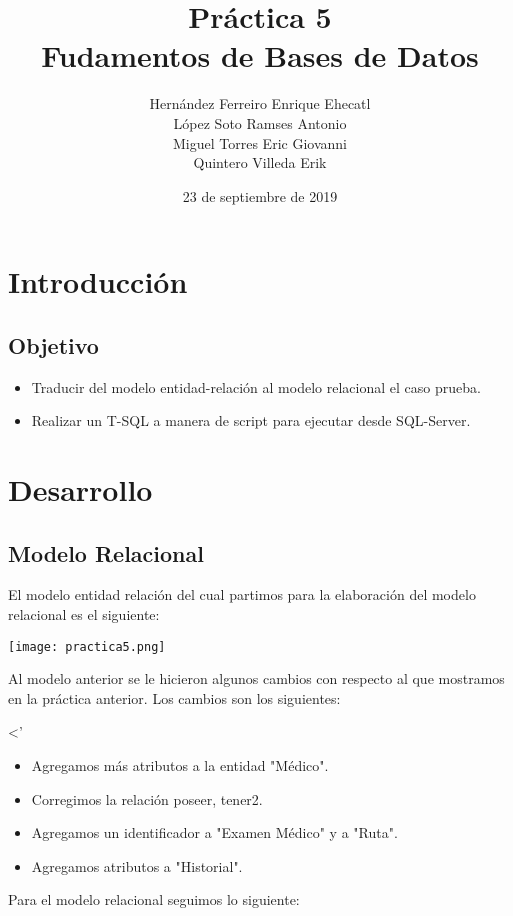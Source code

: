 \documentclass[12pt, letterpaper]{article}
\author{Hernández Ferreiro Enrique Ehecatl \\
        López Soto Ramses Antonio \\
        Miguel Torres Eric Giovanni \\
        Quintero Villeda Erik}
\title{Práctica 5 \\
       {\small Fudamentos de Bases de Datos}}
\date{23 de septiembre de 2019}
\begin{document}
    \maketitle

    \section*{Introducción}

        \subsection*{Objetivo}
            \begin{itemize}
                \item Traducir del modelo entidad-relación al modelo relacional el caso prueba.
                \item Realizar un T-SQL a manera de script para ejecutar desde SQL-Server.
            \end{itemize}

    \section*{Desarrollo}

        \subsection*{Modelo Relacional}
        El modelo entidad relación del cual partimos para la elaboración del modelo relacional es el siguiente:

            \texttt{[image: practica5.png]}

        Al modelo anterior se le hicieron algunos cambios con respecto al que mostramos en la práctica anterior.
        Los cambios son los siguientes:

        <'\begin{itemize}
            \item Agregamos más atributos a la entidad "Médico".
            \item Corregimos la relación poseer, tener2.
            \item Agregamos un identificador a "Examen Médico" y a "Ruta".
            \item Agregamos atributos a "Historial".
        \end{itemize}

        Para el modelo relacional seguimos lo siguiente:\vspace{.2cm}
\end{document}
